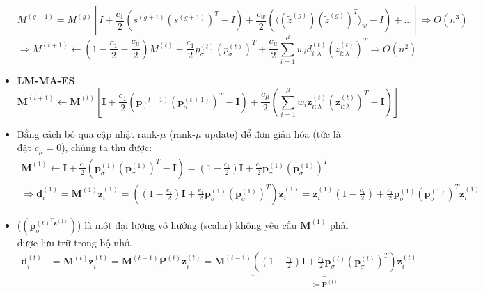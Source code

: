 \documentclass{book}
\begin{document}
\begin{itemize}
    \begin{equation*}
        M^{(g+1)} = M^{(g)}\left[I + \frac{c_1}{2}(s^{(g+1)}(s^{(g+1)})^T - I) + \frac{c_w}{2}(\langle(\tilde{z}^{(g)})(\tilde{z}^{(g)})^T\rangle_w - I) + ...\right] \Rightarrow O(n^3)
    \end{equation*}
    \begin{equation*}
        \Rightarrow M^{(t+1)} \gets \left(1 - \frac{c_1}{2} - \frac{c_\mu}{2}\right)M^{(t)} + \frac{c_1}{2}p_\sigma^{(t)}(p_\sigma^{(t)})^T + \frac{c_\mu}{2}\sum_{i=1}^\mu w_i d_{i:\lambda}^{(t)}(z_{i:\lambda}^{(t)})^T \Rightarrow O(n^2)
    \end{equation*}
    \item \textbf{LM-MA-ES}
    \begin{equation*}
        \mathbf{M}^{(t+1)} \gets \mathbf{M}^{(t)}\left[\mathbf{I}+\frac{c_1}{2}\left(\mathbf{p}_{\sigma}^{(t+1)}(\mathbf{p}_{\sigma}^{(t+1)})^T-\mathbf{I}\right)+\frac{c_{\mu}}{2}\left(\sum_{i=1}^{\mu} w_i \mathbf{z}_{i: \lambda}^{(t)}(\mathbf{z}_{i: \lambda}^{(t)})^T-\mathbf{I}\right)\right]
    \end{equation*}
    \item Bằng cách bỏ qua cập nhật rank-$\mu$ (rank-$\mu$ update) để đơn giản hóa (tức là đặt $c_\mu=0$), chúng ta thu được:
    \begin{equation*}
        \begin{aligned}
            \mathbf{M}^{(1)} \gets \mathbf{I}+\frac{c_1}{2}\left(\mathbf{p}_{\sigma}^{(1)}(\mathbf{p}_{\sigma}^{(1)})^T-\mathbf{I}\right) = \left(1-\frac{c_1}{2}\right) \mathbf{I}+\frac{c_1}{2} \mathbf{p}_{\sigma}^{(1)}(\mathbf{p}_{\sigma}^{(1)})^T \\
            \Rightarrow \mathbf{d}_i^{(1)} = \mathbf{M}^{(1)} \mathbf{z}_i^{(1)} = \left(\left(1-\frac{c_1}{2}\right) \mathbf{I}+\frac{c_1}{2} \mathbf{p}_{\sigma}^{(1)}(\mathbf{p}_{\sigma}^{(1)})^T\right) \mathbf{z}_i^{(1)} = \mathbf{z}_i^{(1)}\left(1-\frac{c_1}{2}\right)+\frac{c_1}{2} \mathbf{p}_{\sigma}^{(1)}(\mathbf{p}_{\sigma}^{(1)})^T \mathbf{z}_i^{(1)}
        \end{aligned}
    \end{equation*}
    \item ($(\mathbf{p}_\sigma^{(t)^T\mathbf{z}^{(1)}})$) là một đại lượng vô hướng (scalar) không yêu cầu $\mathbf{M}^{(1)}$ phải được lưu trữ trong bộ nhớ.
    \begin{equation*}
        \begin{aligned}
            \mathbf{d}_i^{(t)} &= \mathbf{M}^{(t)}\mathbf{z}_i^{(t)} = \mathbf{M}^{(t-1)}\mathbf{P}^{(t)}\mathbf{z}_i^{(t)} = \mathbf{M}^{(t-1)}\underbrace{\left(\left(1-\frac{c_1}{2}\right)\mathbf{I} + \frac{c_1}{2}\mathbf{p}_\sigma^{(t)}(\mathbf{p}_\sigma^{(t)})^T\right)}_{:=\mathbf{P}^{(t)}}\mathbf{z}_i^{(t)} \\

\end{aligned}
\end{equation*}
\end{itemize}
\end{document}
